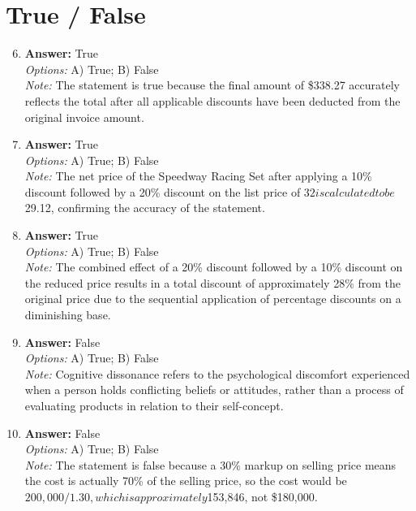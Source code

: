 \documentclass[12pt]{article}
\begin{document}
\section*{True / False}
\begin{enumerate}[label=\arabic*.]
\setcounter{enumi}{5}
\item \textbf{Answer:} True
\\ \textit{Options:} A) True; B) False
\\ \textit{Note:} The statement is true because the final amount of \$338.27 accurately reflects the total after all applicable discounts have been deducted from the original invoice amount.
\item \textbf{Answer:} True
\\ \textit{Options:} A) True; B) False
\\ \textit{Note:} The net price of the Speedway Racing Set after applying a 10\% discount followed by a 20\% discount on the list price of $32 is calculated to be $29.12, confirming the accuracy of the statement.
\item \textbf{Answer:} True
\\ \textit{Options:} A) True; B) False
\\ \textit{Note:} The combined effect of a 20\% discount followed by a 10\% discount on the reduced price results in a total discount of approximately 28\% from the original price due to the sequential application of percentage discounts on a diminishing base.
\item \textbf{Answer:} False
\\ \textit{Options:} A) True; B) False
\\ \textit{Note:} Cognitive dissonance refers to the psychological discomfort experienced when a person holds conflicting beliefs or attitudes, rather than a process of evaluating products in relation to their self-concept.
\item \textbf{Answer:} False
\\ \textit{Options:} A) True; B) False
\\ \textit{Note:} The statement is false because a 30\% markup on selling price means the cost is actually 70\% of the selling price, so the cost would be $200,000 / 1.30, which is approximately $153,846, not \$180,000.
\end{enumerate}
\end{document}
